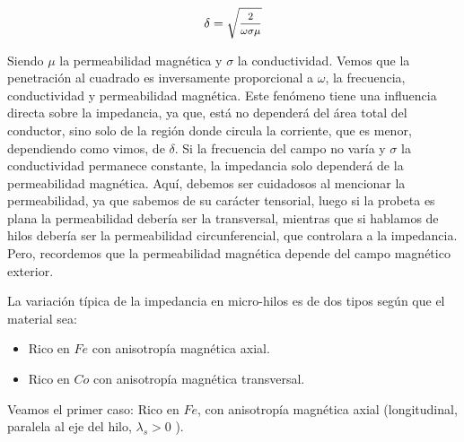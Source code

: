 \begin{equation}
	\delta= \sqrt{\mfrac{2}{\omega\sigma\mu}}
\end{equation}

Siendo $\mu$ la permeabilidad magnética y $\sigma$ la conductividad. Vemos que la penetración al cuadrado es inversamente proporcional a $\omega$, la frecuencia, conductividad y permeabilidad magnética. Este fenómeno tiene una influencia directa sobre la impedancia, ya que, está no dependerá del área total del conductor, sino solo de la región donde circula la corriente, que es menor, dependiendo como vimos, de $\delta$. Si la frecuencia del campo no varía y $\sigma$ la conductividad permanece constante, la impedancia solo dependerá de la permeabilidad magnética. Aquí, debemos ser cuidadosos al mencionar la permeabilidad, ya que sabemos de su carácter tensorial, luego si la probeta es plana la permeabilidad debería ser la transversal, mientras que si hablamos de hilos debería ser la permeabilidad circunferencial, que controlara a la impedancia. Pero, recordemos que la permeabilidad magnética depende del campo magnético exterior.

La variación típica de la impedancia en micro-hilos es de dos tipos según que el material sea:

\begin{itemize}
	\item Rico en $Fe$ con anisotropía magnética axial. 
	\item Rico en $Co$ con anisotropía magnética transversal.
\end{itemize}

Veamos el primer caso: Rico en $Fe$, con anisotropía magnética axial (longitudinal, paralela al eje del hilo, $\lambda_{s}>0$ ).



